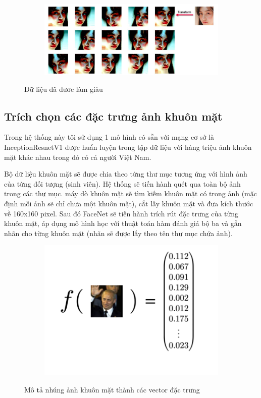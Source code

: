 \begin{figure}
    \begin{subfigure}{1\textwidth}
        \includegraphics[width=1\linewidth]{Chapters/items/chap3_4.jpg}
        \label{fig:chap3_4}
    \end{subfigure}
    \caption{Dữ liệu đã đươc làm giàu}
\end{figure}

\subsection{Trích chọn các đặc trưng ảnh khuôn mặt}
Trong hệ thống này tôi sử dụng 1 mô hình có sẵn với mạng cơ sở là InceptionResnetV1 được
huẩn luyện trong tập dữ liệu với hàng triệu ảnh khuôn mặt khác nhau trong đó có cả người Việt Nam.

Bộ dữ liệu khuôn mặt sẽ được chia theo từng thư mục tương ứng với hình ảnh
của từng đối tượng (sinh viên). Hệ thống sẽ tiến hành quét qua toàn bộ ảnh
trong các thư mục. máy dò khuôn mặt sẽ tìm kiếm khuôn mặt có
trong ảnh (mặc định mỗi ảnh sẽ chỉ chưa một khuôn mặt),
cắt lấy khuôn mặt và đưa kích thước về 160x160 pixel.
Sau đó FaceNet sẽ tiến hành trích rút đặc trưng của từng khuôn mặt,
áp dụng mô hình học với thuật toán hàm đánh giá bộ ba và gắn nhãn cho từng
khuôn mặt (nhãn sẽ được lấy theo tên thư mục chứa ảnh).

\begin{figure}
    \begin{subfigure}{0.4\textwidth}
        \includegraphics[width=1\linewidth]{Chapters/items/embed.png}
        \label{fig:embed}
    \end{subfigure}
    \caption{Mô tả nhúng ảnh khuôn mặt thành các vector đặc trưng}
\end{figure}

